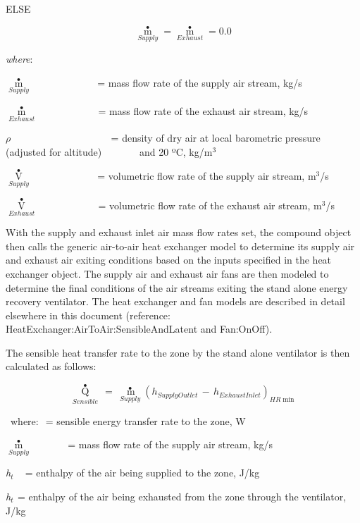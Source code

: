 ELSE

\begin{equation}
{\mathop m\limits^ \bullet_{Supply}} = {\mathop m\limits^ \bullet_{Exhaust}} = 0.0
\end{equation}

\emph{where}:

\({\mathop m\limits^ \bullet_{Supply}}\) ~~~~~~~~~~~~ = mass flow rate of the supply air stream, kg/s

\({\mathop m\limits^ \bullet_{Exhaust}}\) ~~~~~~~~~~~ = mass flow rate of the exhaust air stream, kg/s

\(\rho\) ~~~~~~~~~~~~~~~~~~~ = density of dry air at local barometric pressure (adjusted for altitude)~~~~~~~ and 20 ºC, kg/m\(^{3}\)

\({\mathop V\limits^ \bullet_{Supply}}\) ~~~~~~~~~~~~ = volumetric flow rate of the supply air stream, m\(^{3}\)/s

\({\mathop V\limits^ \bullet_{Exhaust}}\) ~~~~~~~~~~~ = volumetric flow rate of the exhaust air stream, m\(^{3}\)/s

With the supply and exhaust inlet air mass flow rates set, the compound object then calls the generic air-to-air heat exchanger model to determine its supply air and exhaust air exiting conditions based on the inputs specified in the heat exchanger object. The supply air and exhaust air fans are then modeled to determine the final conditions of the air streams exiting the stand alone energy recovery ventilator. The heat exchanger and fan models are described in detail elsewhere in this document (reference: HeatExchanger:AirToAir:SensibleAndLatent and Fan:OnOff).

The sensible heat transfer rate to the zone by the stand alone ventilator is then calculated as follows:

\begin{equation}
{\mathop Q\limits^ \bullet_{Sensible}}\, = \,{\mathop {\,m}\limits^ \bullet_{Supply}}{\left( {{h_{SupplyOutlet}}\, - \,{h_{ExhaustInlet}}} \right)_{HR\min }}
\end{equation}

~where: \(_{ }\) = sensible energy transfer rate to the zone, W

\({\mathop m\limits^ \bullet_{Supply}}\) ~~~~~~ = mass flow rate of the supply air stream, kg/s

\emph{h\(_{t}\)} ~ = enthalpy of the air being supplied to the zone, J/kg

\emph{h\(_{t}\)}\(_{ }\) = enthalpy of the air being exhausted from the zone through the ventilator, J/kg

